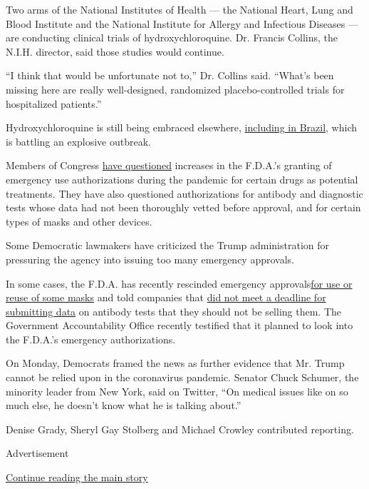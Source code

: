 Two arms of the National Institutes of Health --- the National Heart,
Lung and Blood Institute and the National Institute for Allergy and
Infectious Diseases --- are conducting clinical trials of
hydroxychloroquine. Dr. Francis Collins, the N.I.H. director, said those
studies would continue.

``I think that would be unfortunate not to,'' Dr. Collins said. ``What's
been missing here are really well-designed, randomized
placebo-controlled trials for hospitalized patients.''

Hydroxychloroquine is still being embraced elsewhere,
\href{https://www.nytimes3xbfgragh.onion/2020/06/13/world/americas/virus-brazil-bolsonaro-chloroquine.html}{including
in Brazil,} which is battling an explosive outbreak.

Members of Congress
\href{https://www.warren.senate.gov/imo/media/doc/2020.05.06\%20Letter\%20to\%20FDA\%20re\%20data\%20tracking.pdf}{have
questioned} increases in the F.D.A.'s granting of emergency use
authorizations during the pandemic for certain drugs as potential
treatments. They have also questioned authorizations for antibody and
diagnostic tests whose data had not been thoroughly vetted before
approval, and for certain types of masks and other devices.

Some Democratic lawmakers have criticized the Trump administration for
pressuring the agency into issuing too many emergency approvals.

In some cases, the F.D.A. has recently rescinded emergency
approvals\href{https://www.nytimes3xbfgragh.onion/2020/06/07/science/masks-china-coronavirus.html}{for
use or reuse of some masks} and told companies that
\href{https://www.nytimes3xbfgragh.onion/2020/05/04/health/fda-antibody-tests-coronavirus.html}{did
not meet a deadline for submitting data} on antibody tests that they
should not be selling them. The Government Accountability Office
recently testified that it planned to look into the F.D.A.'s emergency
authorizations.

On Monday, Democrats framed the news as further evidence that Mr. Trump
cannot be relied upon in the coronavirus pandemic. Senator Chuck
Schumer, the minority leader from New York, said on Twitter, ``On
medical issues like on so much else, he doesn't know what he is talking
about.''

Denise Grady, Sheryl Gay Stolberg and Michael Crowley contributed
reporting.

Advertisement

\protect\hyperlink{after-bottom}{Continue reading the main story}

